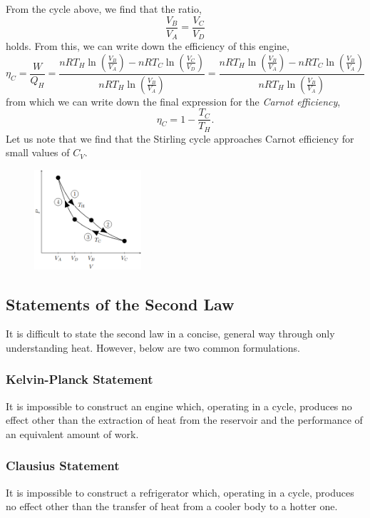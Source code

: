 \documentclass{book}
\begin{document}
From the cycle above, we find that the ratio,
\begin{equation}
	\frac{V_B}{V_A} = \frac{V_C}{V_D}
\end{equation}
holds. From this, we can write down the efficiency of this engine,
\begin{equation}
	\eta_C  = \frac{W}{Q_H} = \frac{nRT_H\ln\left(\frac{V_B}{V_A}\right) - nRT_C\ln\left(\frac{V_C}{V_D}\right)}{nRT_H\ln\left(\frac{V_B}{V_A}\right)} = \frac{nRT_H\ln\left(\frac{V_B}{V_A}\right) - nRT_C\ln\left(\frac{V_B}{V_A}\right)}{nRT_H\ln\left(\frac{V_B}{V_A}\right)}
\end{equation}
from which we can write down the final expression for the \textit{Carnot efficiency},
\begin{equation}
	\boxed{\eta_C = 1 - \frac{T_C}{T_H}}.
\end{equation}
Let us note that we find that the Stirling cycle approaches Carnot efficiency for small values of $C_V$.
\begin{figure}
	\centering
	\includegraphics[width=150px]{carnot.png}
	\caption{} \label{fig:carnot}
\end{figure}
\subsection{Statements of the Second Law}
It is difficult to state the second law in a concise, general way through only understanding heat. However, below are two common formulations.

\subsubsection{Kelvin-Planck Statement}
\begin{tcolorbox}
	It is impossible to construct an engine which, operating in a cycle, produces no effect other than the extraction of heat from the reservoir and the performance of an equivalent amount of work.
\end{tcolorbox}

\subsubsection{Clausius Statement}
\begin{tcolorbox}
	It is impossible to construct a refrigerator which, operating in a cycle, produces no effect other than the transfer of heat from a cooler body to a hotter one.
\end{tcolorbox}
\end{document}
